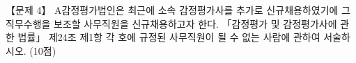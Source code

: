 \begin{longquestion}{【문제 4】}
A감정평가법인은 최근에 소속 감정평가사를 추가로 신규채용하였기에 그 직무수행을 보조할 사무직원을 신규채용하고자 한다. 「감정평가 및 감정평가사에 관한 법률」 제24조 제1항 각 호에 규정된 사무직원이 될 수 없는 사람에 관하여 서술하시오. (10점) \par
\end{longquestion}
